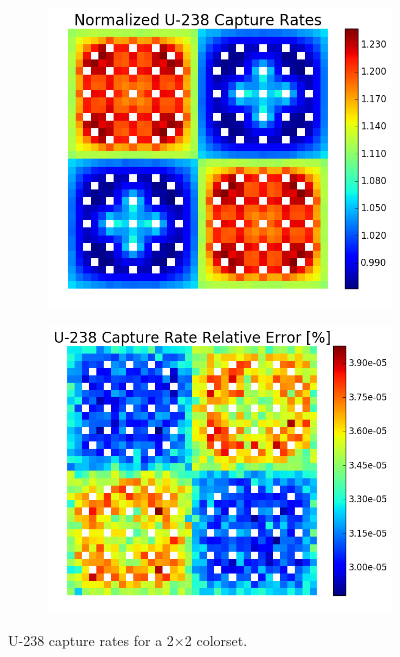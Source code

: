 \begin{figure}[h!]
\centering
\begin{subfigure}{0.5\textwidth}
  \centering
  \includegraphics[width=\linewidth]{figures/benchmarks/capture-rates/capt-mean-2x2}
  \caption{}
  \label{fig:chap7-capt-rate-mean-2x2}
\end{subfigure}%
\begin{subfigure}{0.5\textwidth}
  \centering
  \includegraphics[width=\linewidth]{figures/benchmarks/capture-rates/capt-rel-err-2x2}
  \caption{}
  \label{fig:chap7-capt-rate-rel-err-2x2}
\end{subfigure}%
\caption[U-238 capture rates for a 2$\times$2 colorset]{U-238 capture rates for a 2$\times$2 colorset.}
\label{fig:chap7-capt-rates-2x2}
\end{figure}

